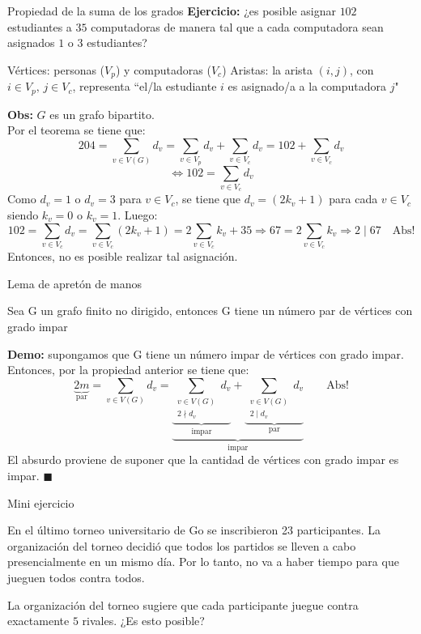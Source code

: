 \documentclass[10pt, aspectratio=169]{beamer}
\begin{document}
\begin{frame}{Propiedad de la suma de los grados}
\textbf{Ejercicio:} ¿es posible asignar $102$ estudiantes a $35$ computadoras de manera tal que a cada computadora sean asignados $1$ o $3$ estudiantes?
\pause
\vskip 0.35cm
\begin{itemize}
    \itemt Vértices: personas ($V_p$) y computadoras ($V_c$)
    \itemt Aristas:  la arista $(i,j)$, con $i\in V_p,\, j\in V_c$, representa ``el/la estudiante $i$ es asignado/a a la computadora $j$"
\end{itemize}
\pause
\textbf{Obs:} $G$ es un grafo bipartito. \\
\vskip 0.2cm
Por el teorema se tiene que:
$$204=\displaystyle\sum_{v\in V(G)}d_v= \sum_{v\in V_p}d_v + \sum_{v\in V_c}d_v = 102 + \sum_{v\in V_c}d_v $$
\[\Leftrightarrow 102= \sum_{v\in V_c}d_v\]
Como $d_v=1$ o $d_v=3$ para $v\in V_c$, se tiene que $d_v=(2k_v+1)$ para cada $v\in V_c$ siendo $k_v=0$ o $k_v=1$. Luego:
$$102= \sum_{v\in V_c}d_v = \sum_{v\in V_c}(2k_v+1) = 2\sum_{v\in V_c}k_v +35 \Rightarrow 67 = 2\sum_{v\in V_c}k_v \Rightarrow 2\mid67 \quad \text{Abs!}$$
Entonces, no es posible realizar tal asignación.
\end{frame}

\begin{frame}{Lema de apretón de manos}
    \small
    \begin{tcolorbox}[title={Handshaking Lemma (Euler$,$ $1736$)}, colback = orange!20, colframe = orange!65!white, coltitle = black]
    Sea G un grafo finito no dirigido, entonces G tiene un número par de vértices con grado impar 
    \end{tcolorbox}
    \textbf{Demo:} \pause supongamos que G tiene un número impar de vértices con grado impar. Entonces, por la propiedad anterior se tiene que:
    $$\underbrace{2m}_{\text{par}} = \displaystyle\sum_{v\in V(G)} d_v= \underbrace{ \underbrace{\displaystyle\sum_{\substack{v\in V(G)\\ 2 \nmid d_v}}d_v}_{\text{impar}} + \underbrace{\displaystyle\sum_{\substack{v\in V(G)\\ 2 \mid d_v}}d_v}_{\text{par}}}_{\text{impar}} \qquad \text{Abs!}  $$
    El absurdo proviene de suponer que la cantidad de vértices con grado impar es impar. $\blacksquare$
    
\end{frame}


\begin{frame}{Mini ejercicio}

En el \'ultimo torneo universitario de Go se inscribieron 23 participantes. La organizaci\'on del torneo decidi\'o que todos los partidos se lleven a cabo presencialmente en un mismo d\'ia. Por lo tanto, no va a haber tiempo para que jueguen todos contra todos. 


La organizaci\'on del torneo sugiere que cada participante juegue contra exactamente $5$ rivales. ¿Es esto posible? %

\end{frame}
\end{document}
